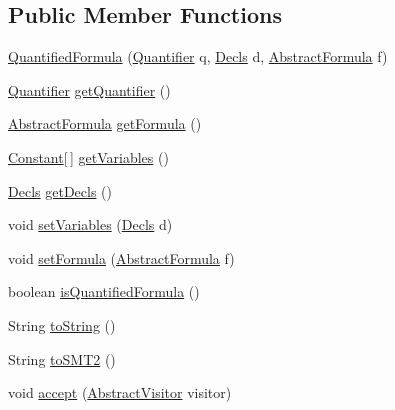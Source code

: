 \subsection*{Public Member Functions}
\begin{DoxyCompactItemize}
\item 
\hyperlink{classuran_1_1formula_1_1_quantified_formula_a62bf822a56af8cbe293dfed514daeb00}{Quantified\+Formula} (\hyperlink{enumuran_1_1formula_1_1_quantifier}{Quantifier} q, \hyperlink{classuran_1_1formula_1_1_decls}{Decls} d, \hyperlink{classuran_1_1formula_1_1_abstract_formula}{Abstract\+Formula} f)
\item 
\hyperlink{enumuran_1_1formula_1_1_quantifier}{Quantifier} \hyperlink{classuran_1_1formula_1_1_quantified_formula_ac3902f85e5e672c7bfda0f21d1795b11}{get\+Quantifier} ()
\item 
\hyperlink{classuran_1_1formula_1_1_abstract_formula}{Abstract\+Formula} \hyperlink{classuran_1_1formula_1_1_quantified_formula_ae5c041f859073ed83b59097ed891e6ea}{get\+Formula} ()
\item 
\hyperlink{classuran_1_1formula_1_1_constant}{Constant}\mbox{[}$\,$\mbox{]} \hyperlink{classuran_1_1formula_1_1_quantified_formula_af7d03640bc1b5607bb52b4ac45ccb407}{get\+Variables} ()
\item 
\hyperlink{classuran_1_1formula_1_1_decls}{Decls} \hyperlink{classuran_1_1formula_1_1_quantified_formula_a8317aff58070511e4c8422cdec888b8b}{get\+Decls} ()
\item 
void \hyperlink{classuran_1_1formula_1_1_quantified_formula_a30287599a1eae9eccf9c8e10f03a9118}{set\+Variables} (\hyperlink{classuran_1_1formula_1_1_decls}{Decls} d)
\item 
void \hyperlink{classuran_1_1formula_1_1_quantified_formula_a183b4f1493c01f0f86222af4abae6206}{set\+Formula} (\hyperlink{classuran_1_1formula_1_1_abstract_formula}{Abstract\+Formula} f)
\item 
boolean \hyperlink{classuran_1_1formula_1_1_quantified_formula_a7c3b3c56b76f1957659e84e6f22002e8}{is\+Quantified\+Formula} ()
\item 
String \hyperlink{classuran_1_1formula_1_1_quantified_formula_a467f75acab697e225daea1f69a8185d1}{to\+String} ()
\item 
String \hyperlink{classuran_1_1formula_1_1_quantified_formula_acbdb69517ff551437becaf17ebbb1f92}{to\+S\+M\+T2} ()
\item 
void \hyperlink{classuran_1_1formula_1_1_quantified_formula_a39abdfb0445fbb284b82ffcc6942654d}{accept} (\hyperlink{classuran_1_1formula_1_1visitor_1_1_abstract_visitor}{Abstract\+Visitor} visitor)
\end{DoxyCompactItemize}


